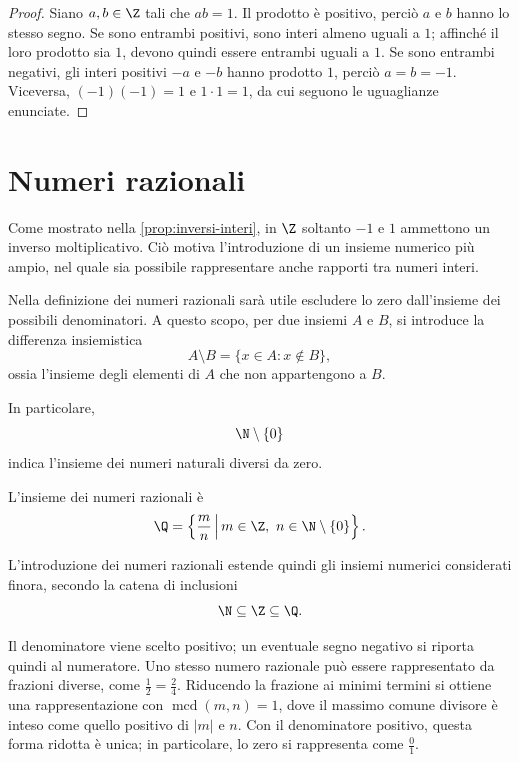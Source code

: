 \begin{proof}
Siano \(a,b\in\Z\) tali che \(ab=1\). Il prodotto è positivo, perciò
\(a\) e \(b\) hanno lo stesso segno. Se sono entrambi positivi, sono
interi almeno uguali a \(1\); affinché il loro prodotto sia \(1\), devono
quindi essere entrambi uguali a \(1\). Se sono entrambi negativi, gli
interi positivi \(-a\) e \(-b\) hanno prodotto \(1\), perciò
\(a=b=-1\). Viceversa, \((-1)(-1)=1\) e \(1\cdot1=1\), da cui seguono
le uguaglianze enunciate.
\end{proof}

\section{Numeri razionali}
\label{sec:lez02-numeri-razionali}

Come mostrato nella \cref{prop:inversi-interi}, in \(\Z\) soltanto
\(-1\) e \(1\) ammettono un inverso moltiplicativo. Ciò motiva
l'introduzione di un insieme numerico più ampio, nel quale sia possibile
rappresentare anche rapporti tra numeri interi.

Nella definizione dei numeri razionali sarà utile escludere lo zero
dall'insieme dei possibili denominatori. A questo scopo, per due insiemi
\(A\) e \(B\), si introduce la differenza insiemistica
\[
  A\setminus B=\{x\in A:x\notin B\},
\]
ossia l'insieme degli elementi di \(A\) che non appartengono a \(B\).

In particolare,
\[
  \N\setminus\{0\}
\]
indica l'insieme dei numeri naturali diversi da zero.

\begin{definition}
\label{def:numeri-razionali}
L'insieme dei numeri razionali è
\[
  \Q=\left\{\frac{m}{n}\,\middle|\,
    m\in\Z,\ n\in\N\setminus\{0\}\right\}.
\]
\end{definition}

L'introduzione dei numeri razionali estende quindi gli insiemi numerici
considerati finora, secondo la catena di inclusioni
\[
  \N\subseteq\Z\subseteq\Q.
\]

Il denominatore viene scelto positivo; un eventuale segno negativo si
riporta quindi al numeratore. Uno stesso numero razionale può essere
rappresentato da frazioni diverse, come \(\frac12=\frac24\). Riducendo
la frazione ai minimi termini si ottiene una rappresentazione con
\(\operatorname{mcd}(m,n)=1\), dove il massimo comune divisore è inteso
come quello positivo di \(|m|\) e \(n\). Con il denominatore positivo,
questa forma ridotta è unica; in particolare, lo zero si rappresenta
come \(\frac01\).

